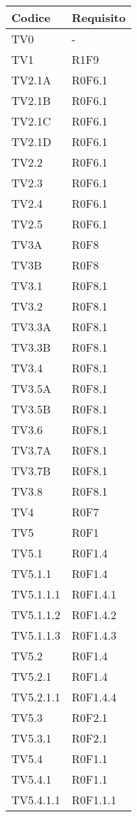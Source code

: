 \documentclass[PianoDiQualifica.tex]{subfiles}
\begin{document}
\begin{longtable}[H]{P{6.5cm}P{7cm}}
	\color{CHeaderText}\textbf{Codice} & 
	\color{CHeaderText}\textbf{Requisito} \\
	\endhead
	TV0  & - \\
	TV1  & R1F9 \\
	TV2.1A  & R0F6.1 \\
	TV2.1B  & R0F6.1 \\
	TV2.1C  & R0F6.1 \\
	TV2.1D  & R0F6.1 \\
	TV2.2 &  R0F6.1 \\ 
	TV2.3 &  R0F6.1 \\ 
	TV2.4 &  R0F6.1 \\ 
	TV2.5 &  R0F6.1 \\ 
	TV3A  & R0F8 \\ 
	TV3B  & R0F8 \\ 
	TV3.1  & R0F8.1 \\ 
	TV3.2  & R0F8.1 \\ 
	TV3.3A  & R0F8.1 \\ 
	TV3.3B  & R0F8.1 \\ 
	TV3.4  & R0F8.1 \\ 
	TV3.5A  & R0F8.1 \\ 
	TV3.5B  & R0F8.1 \\ 
	TV3.6  & R0F8.1 \\ 
	TV3.7A  & R0F8.1 \\ 
	TV3.7B  & R0F8.1 \\ 
	TV3.8  & R0F8.1 \\ 
	TV4  & R0F7 \\ 
	TV5  & R0F1 \\ 
	TV5.1  & R0F1.4 \\ 
	TV5.1.1 &  R0F1.4  \\ 
	TV5.1.1.1  &  R0F1.4.1 \\ 
	TV5.1.1.2  & R0F1.4.2 \\ 
	TV5.1.1.3  & R0F1.4.3 \\ 
	TV5.2  & R0F1.4 \\ 
	TV5.2.1  & R0F1.4 \\ 
	TV5.2.1.1  & R0F1.4.4 \\ 
	TV5.3  & R0F2.1 \\ 
	TV5.3.1  & R0F2.1 \\ 
	TV5.4  & R0F1.1 \\ 
	TV5.4.1  & R0F1.1 \\ 
	TV5.4.1.1  & R0F1.1.1 \\ 

\end{longtable}
\end{document}
